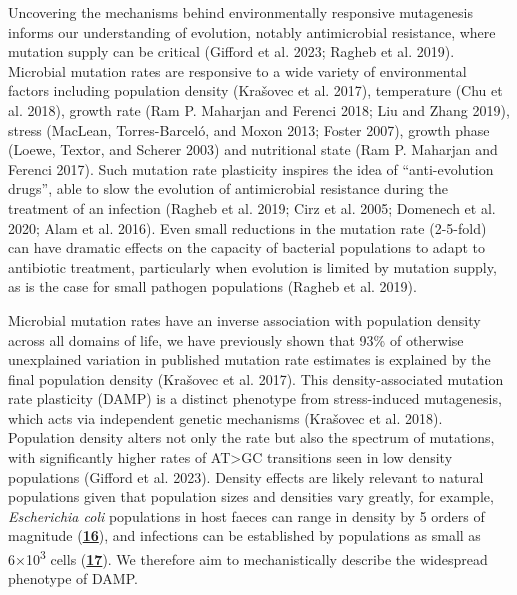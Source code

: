 \documentclass[
  12pt,
  letterpaper,
  DIV=11,
  numbers=noendperiod]{scrreprt}
\begin{document}
Uncovering the mechanisms behind environmentally responsive mutagenesis
informs our understanding of evolution, notably antimicrobial
resistance, where mutation supply can be critical (Gifford et al. 2023;
Ragheb et al. 2019). Microbial mutation rates are responsive to a wide
variety of environmental factors including population density (Krašovec
et al. 2017), temperature (Chu et al. 2018), growth rate (Ram P.
Maharjan and Ferenci 2018; Liu and Zhang 2019), stress (MacLean,
Torres-Barceló, and Moxon 2013; Foster 2007), growth phase (Loewe,
Textor, and Scherer 2003) and nutritional state (Ram P. Maharjan and
Ferenci 2017). Such mutation rate plasticity inspires the idea of
``anti-evolution drugs'', able to slow the evolution of antimicrobial
resistance during the treatment of an infection (Ragheb et al. 2019;
Cirz et al. 2005; Domenech et al. 2020; Alam et al. 2016). Even small
reductions in the mutation rate (2-5-fold) can have dramatic effects on
the capacity of bacterial populations to adapt to antibiotic treatment,
particularly when evolution is limited by mutation supply, as is the
case for small pathogen populations (Ragheb et al. 2019).

Microbial mutation rates have an inverse association with population
density across all domains of life, we have previously shown that 93\%
of otherwise unexplained variation in published mutation rate estimates
is explained by the final population density (Krašovec et al. 2017).
This density-associated mutation rate plasticity (DAMP) is a distinct
phenotype from stress-induced mutagenesis, which acts via independent
genetic mechanisms (Krašovec et al. 2018). Population density alters not
only the rate but also the spectrum of mutations, with significantly
higher rates of AT\textgreater GC transitions seen in low density
populations (Gifford et al. 2023). Density effects are likely relevant
to natural populations given that population sizes and densities vary
greatly, for example, \emph{Escherichia coli} populations in host faeces
can range in density by 5 orders of magnitude
(\href{https://www.biorxiv.org/content/10.1101/2023.09.27.557722v1.full\#ref-16}{\textbf{16}}),
and infections can be established by populations as small as
6×10\textsuperscript{3} cells
(\href{https://www.biorxiv.org/content/10.1101/2023.09.27.557722v1.full\#ref-17}{\textbf{17}}).
We therefore aim to mechanistically describe the widespread phenotype of
DAMP.
\end{document}
